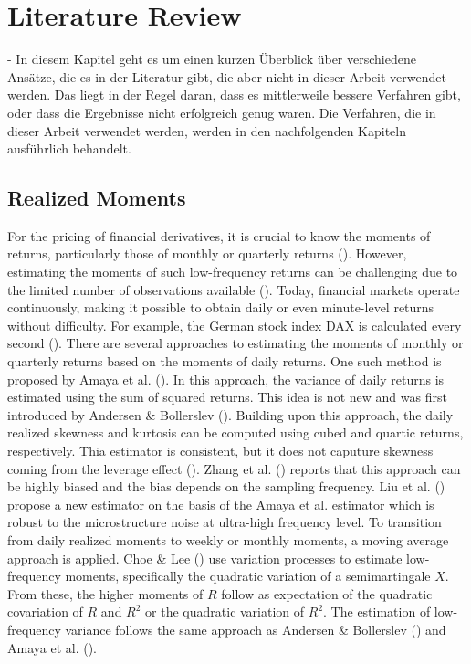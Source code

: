 \chapter{Literature Review}
\label{sec:literature}

- In diesem Kapitel geht es um einen kurzen Überblick über verschiedene Ansätze, die es in der Literatur gibt, die aber nicht in dieser Arbeit verwendet werden. Das liegt in der Regel daran, dass es mittlerweile bessere Verfahren gibt, oder dass die Ergebnisse nicht erfolgreich genug waren. Die Verfahren, die in dieser Arbeit verwendet werden, werden in den nachfolgenden Kapiteln ausführlich behandelt.

\section{Realized Moments}
For the pricing of financial derivatives, it is crucial to know the moments of returns, particularly those of monthly or quarterly returns (\cite{barroRareDisastersAsset2006}). However, estimating the moments of such low-frequency returns can be challenging due to the limited number of observations available (\cite{neubergerSkewnessStockMarket2021}). Today, financial markets operate continuously, making it possible to obtain daily or even minute-level returns without difficulty. For example, the German stock index DAX is calculated every second (\cite{boersefrankfurtFunktioniertBoerse}). There are several approaches to estimating the moments of monthly or quarterly returns based on the moments of daily returns. One such method is proposed by Amaya et al. (\citeyear{amayaDoesRealizedSkewness2015}). In this approach, the variance of daily returns is estimated using the sum of squared returns. This idea is not new and was first introduced by Andersen \& Bollerslev (\citeyear{andersenAnsweringSkepticsYes1998}). Building upon this approach, the daily realized skewness and kurtosis can be computed using cubed and quartic returns, respectively. Thia estimator is consistent, but it does not caputure skewness coming from the leverage effect (\cite{galloDynamicTailRisk2024}). Zhang et al. (\citeyear{zhangTaleTwoTime2005}) reports that this approach can be highly biased and the bias depends on the sampling frequency. Liu et al. (\citeyear{liuRealizedSkewnessHigh2014}) propose a new estimator on the basis of the Amaya et al. estimator which is robust to the microstructure noise at ultra-high frequency level. To transition from daily realized moments to weekly or monthly moments, a moving average approach is applied. Choe \& Lee (\citeyear{choeHighMomentVariations2014}) use variation processes to estimate low-frequency moments, specifically the quadratic variation of a semimartingale $X$. From these, the higher moments of $R$ follow as expectation of the quadratic covariation of $R$ and $R^2$ or the quadratic variation of $R^2$. The estimation of low-frequency variance follows the same approach as Andersen \& Bollerslev (\citeyear{andersenAnsweringSkepticsYes1998}) and Amaya et al. (\citeyear{amayaDoesRealizedSkewness2015}). 

